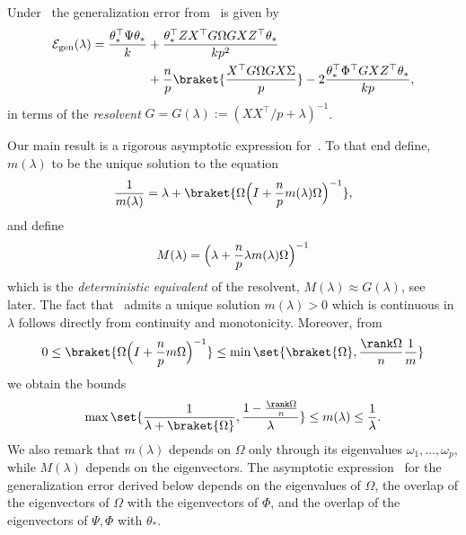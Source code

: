 Under~ the generalization error from~ is given by
\begin{equation}\label{eq:gen_err}
    \begin{aligned}
        \mathcal E_\mathrm{gen}(\lambda) = \frac{\theta_\ast^\top\Psi\theta_\ast}{k} &+ \frac{\theta_\ast^\top Z X^\top G\Omega GX Z^\top \theta_\ast }{k p^2} \\
        & +  \frac{n}{p}\braket{\frac{X^\top G\Omega GX\Sigma}{p}} -2 \frac{\theta_\ast^\top \Phi^\top G X Z^\top \theta_\ast}{kp},
    \end{aligned}
\end{equation}
in terms of the \emph{resolvent} $G=G(\lambda):=(XX^\top/p+\lambda)^{-1}$.

Our main result is a rigorous asymptotic expression for~. To that end define, $m(\lambda)$ to be the unique solution to the equation
\begin{equation}\label{eq m def}
    \frac{1}{m(\lambda)}=\lambda +\braket{\Omega \Bigl( I + \frac{n}{p} m(\lambda)\Omega\Bigr)^{-1}},
\end{equation}
and define
\begin{equation}\label{eq M def}
    M(\lambda)=\Bigl( \lambda + \frac{n}{p}\lambda m(\lambda)\Omega\Bigr)^{-1}
\end{equation}
which is the \emph{deterministic equivalent} of the resolvent, $M(\lambda)\approx G(\lambda)$, see~ later. The fact that~ admits a unique solution $m(\lambda)>0$ which is continuous in $\lambda$ follows directly from continuity and monotonicity. Moreover, from
\begin{equation*}
    0\le \braket{\Omega \Bigl( I + \frac{n}{p} m\Omega\Bigr)^{-1}} \le \min\set{\braket{\Omega}, \frac{\rank \Omega}{n}\frac{1}{m}}
\end{equation*}
we obtain the bounds
\begin{equation}
    \max\set{\frac{1}{\lambda+\braket{\Omega}},\frac{1-\frac{\rank\Omega}{n}}{\lambda}} \le m(\lambda) \le \frac{1}{\lambda}.
\end{equation}
We also remark that $m(\lambda)$ depends on $\Omega$ only through its eigenvalues $\omega_1,\ldots,\omega_p$, while $M(\lambda)$ depends on the eigenvectors. The asymptotic expression~ for the generalization error derived below depends on the eigenvalues of $\Omega$, the overlap of the eigenvectors of $\Omega$ with the eigenvectors of $\Phi$, and the overlap of the eigenvectors of $\Psi,\Phi$ with $\theta_\ast$.

